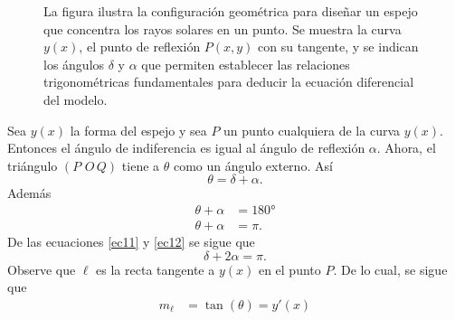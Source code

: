 \begin{example}{}{}
\begin{figure}
        \caption{La figura ilustra la configuración geométrica para diseñar un espejo que concentra los rayos solares en un punto. Se muestra la curva $y(x)$, el punto de reflexión $P(x,y)$ con su tangente, y se indican los ángulos $\delta$ y $\alpha$ que permiten establecer las relaciones trigonométricas fundamentales para deducir la ecuación diferencial del modelo.}
        \label{fig05}
    \end{figure}
    \solucion Sea $y(x)$ la forma del espejo y sea $P$ un punto cualquiera de la curva $y(x)$. Entonces el ángulo de indiferencia es igual al ángulo de reflexión $\alpha$. Ahora, el triángulo $(P \,\, O \, Q)$ tiene a $\theta$ como un ángulo externo. Así
    \begin{equation}
        \theta = \delta + \alpha. \label{ec11}
    \end{equation}
    Además
    \begin{align}
        \theta + \alpha & = 180° \nonumber \\
        \theta + \alpha & = \pi. \label{ec12}
    \end{align}
    De las ecuaciones \eqref{ec11} y \eqref{ec12} se sigue que
    \begin{equation}
        \delta + 2\alpha = \pi. \label{ec13}
    \end{equation}
    Observe que $\ell$ es la recta tangente a $y(x)$ en el punto $P$. De lo cual, se sigue que
    \begin{align*}
        m_\ell & = \tan(\theta) = y'(x) \\

\end{align*}
\end{example}
